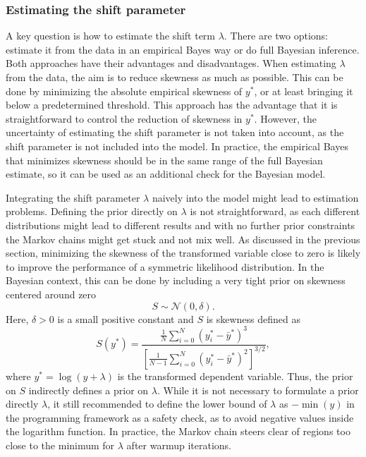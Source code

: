 \subsubsection{Estimating the shift parameter}
A key question is how to estimate the shift term $\lambda$.
There are two options: estimate it from the data in an empirical Bayes way or do full Bayesian inference.
Both approaches have their advantages and disadvantages.
When estimating $\lambda$ from the data, the aim is to reduce skewness as much as possible.
This can be done by minimizing the absolute empirical skewness of $y^*$, or at least bringing it below a predetermined threshold.
This approach has the advantage that it is straightforward to control the reduction of skewness in $y^*$.
However, the uncertainty of estimating the shift parameter is not taken into account, as the shift parameter is not included into the model.
In practice, the empirical Bayes that minimizes skewness should be in the same range of the full Bayesian estimate, so it can be used as an additional check for the Bayesian model.

Integrating the shift parameter $\lambda$ naively into the model might lead to estimation problems.
Defining the prior directly on $\lambda$ is not straightforward, as each different distributions might lead to different results and with no further prior constraints the Markov chains might get stuck and not mix well.
As discussed in the previous section, minimizing the skewness of the transformed variable close to zero is likely to improve the performance of a symmetric likelihood distribution.
In the Bayesian context, this can be done by including a very tight prior on skewness centered around zero
\begin{equation*}
    S \sim \mathcal N(0, \delta).
\end{equation*}
Here, $\delta > 0$ is a small positive constant and $S$ is skewness defined as
\begin{equation*}
    \displaystyle S(y^*) =  \frac{\frac 1 N \sum^{N}_{i = 0} (y_i^* - \bar y^* )^3}
    {\left[ \frac{1}{N - 1} \sum^{N}_{i = 0} (y_i^* - \bar y^* )^2 \right]^{3/2}},
\end{equation*}
where $y^* = \log(y + \lambda)$ is the transformed dependent variable. Thus, the prior on $S$ indirectly defines a prior on $\lambda$.
While it is not necessary to formulate a prior directly $\lambda$, it still recommended to define the lower bound of $\lambda$ as $-\min(y)$ in the programming framework as a safety check, as to avoid negative values inside the logarithm function.
In practice, the Markov chain steers clear of regions too close to the minimum for $\lambda$ after warmup iterations.



